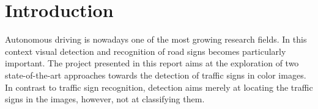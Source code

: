 \documentclass[12pt,a4paper,bibliography=totocnumbered,listof=totocnumbered]{scrartcl}
\begin{document}

\tableofcontents %

\newpage %



\renewcommand{\sectionmark}[1]{\markright{#1}}
\renewcommand{\subsectionmark}[1]{}
\renewcommand{\subsubsectionmark}[1]{}
\rhead{\rightmark}

\onehalfspacing
\renewcommand{\thesection}{\arabic{section}}
\renewcommand{\theHsection}{\arabic{section}}
\setcounter{section}{0}
\setcounter{page}{1}


\section{Introduction}
Autonomous driving is nowadays one of the most growing research fields. In this context visual detection and recognition of road signs becomes particularly important. The project presented in this report aims at the exploration of two state-of-the-art approaches towards the detection of traffic signs in color images. In contrast to traffic sign recognition, detection aims merely at locating the traffic signs in the images, however, not at classifying them. 
\end{document}
